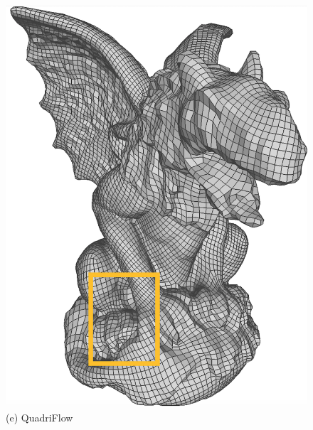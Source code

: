 \begin{figure}
\begin{minipage}{0.16\textwidth}
  \includegraphics[width=\textwidth,height=1.33\textwidth]{quadriflow/teaser/teasers1.png}\\
   (e) QuadriFlow
   \end{minipage}
    \begin{minipage}{0.16\textwidth}
 	\centering

\end{minipage}
\end{figure}
